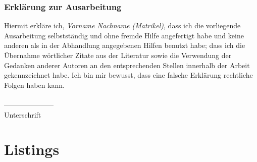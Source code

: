 \documentclass[fleqn,10.5pt,ngerman]{SelfArx}
\begin{document}
\newpage
\clearpage
\appendix
\cleardoublepage
\onecolumn





\subsubsection*{Erklärung zur Ausarbeitung}
Hiermit erkläre ich, {\it Vorname Nachname (Matrikel)}, dass ich die vorliegende Ausarbeitung selbstständig und ohne fremde Hilfe angefertigt habe und keine anderen als in der Abhandlung angegebenen Hilfen benutzt habe; dass ich die Übernahme wörtlicher Zitate aus der Literatur sowie die Verwendung der Gedanken anderer Autoren an den entsprechenden Stellen innerhalb der Arbeit gekennzeichnet habe. Ich bin mir bewusst, dass eine falsche Erklärung rechtliche Folgen haben kann.\\ \\
--------------------- \\
Unterschrift


\clearpage
\appendix
\cleardoublepage
\newpage
\onecolumn

\section{Listings}



\end{document}
